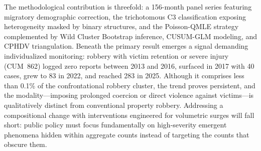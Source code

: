 \documentclass[pdflatex,sn-basic]{sn-jnl}
\begin{document}
The methodological contribution is threefold: a 156-month panel series featuring migratory demographic correction, the trichotomous C3 classification exposing heterogeneity masked by binary structures, and the Poisson-QMLE strategy complemented by Wild Cluster Bootstrap inference, CUSUM-GLM modeling, and CPHDV triangulation. Beneath the primary result emerges a signal demanding individualized monitoring: robbery with victim retention or severe injury (CUM~862) logged zero reports between 2013 and 2016, surfaced in 2017 with 40 cases, grew to 83 in 2022, and reached 283 in 2025. Although it comprises less than 0.1\% of the confrontational robbery cluster, the trend proves persistent, and the modality---imposing prolonged coercion or direct violence against victims---is qualitatively distinct from conventional property robbery. Addressing a compositional change with interventions engineered for volumetric surges will fall short: public policy must focus fundamentally on high-severity emergent phenomena hidden within aggregate counts instead of targeting the counts that obscure them.
\end{document}
